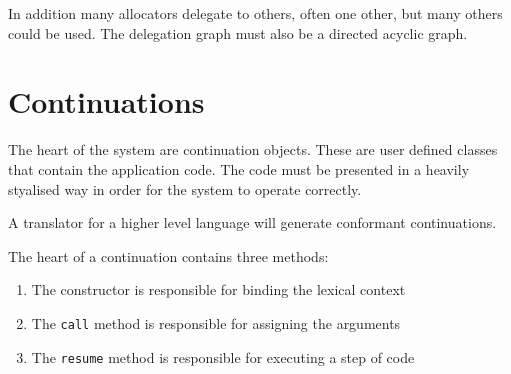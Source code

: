\documentclass[oneside]{book}
\begin{document}
In addition many allocators delegate to others, often one other,
but many others could be used. The delegation graph must also
be a directed acyclic graph.

\chapter{Continuations}
The heart of the system are continuation objects. These are user defined
classes that contain the application code. The code must be presented
in a heavily styalised way in order for the system to operate correctly.

A translator for a higher level language will generate conformant
continuations.

The heart of a continuation contains three methods:
\begin{enumerate}
\item The constructor is responsible for binding the lexical context
\item The \verb$call$ method is responsible for assigning the arguments
\item The \verb$resume$ method is responsible for executing a step of code
\end{enumerate}
\end{document}
